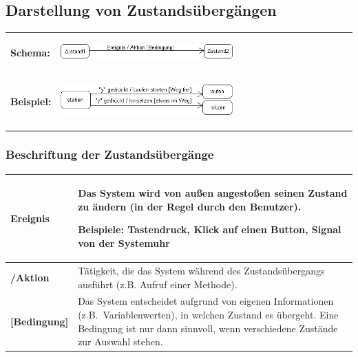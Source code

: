 \subsection{Darstellung von Zustandsübergängen}

\bgroup
\def\arraystretch{1.2}
\begin{tabular}{lp{55mm}}
\vspace{4mm}
\textbf{Schema:} &
\vspace{-6mm}
\begin{center}
\includegraphics[width=0.6\textwidth]{./inf/SEKII/11_UML_Zustandsdiagramme/schemaZustandsuebergang.png}
\end{center}
\\
\vspace{4mm}
\textbf{Beispiel:} &
\vspace{-8mm}
\begin{center}
\includegraphics[width=0.6\textwidth]{./inf/SEKII/11_UML_Zustandsdiagramme/beispielZustandsuebergang.png}
\end{center}
\\
\end{tabular}
\egroup


\subsubsection{Beschriftung der Zustandsübergänge}

\bgroup
\def\arraystretch{1.2}
\begin{tabular}{|l|p{130mm}|}
\hline
\textbf{Ereignis} &
Das System wird von außen angestoßen seinen Zustand zu ändern
(in der Regel durch den Benutzer).

Beispiele: Tastendruck, Klick auf einen Button, Signal von der Systemuhr
\\ \hline
\textbf{/Aktion} & 
Tätigkeit, die das System während des Zustandsübergangs
ausführt (z.B. Aufruf einer Methode).
\\ \hline
\textbf{[Bedingung]} &
Das System entscheidet aufgrund von eigenen Informationen
(z.B.\ Variablenwerten), in welchen Zustand es übergeht.
Eine Bedingung ist nur dann sinnvoll, wenn verschiedene Zustände zur Auswahl stehen.
\\ \hline
\end{tabular}
\egroup



